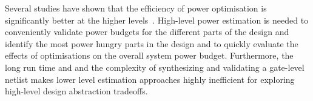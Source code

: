 %


Several studies have shown that the efficiency of power optimisation is significantly better at the higher levels~\cite{Landman1996,Gupta2000,Raghunathan2003,Reimer2006}.
High-level power estimation is needed to conveniently validate power budgets for the different parts of the design and identify the most power hungry parts in the design and to quickly evaluate the effects of optimisations on the overall system power budget.
Furthermore, the long run time and and the complexity of synthesizing and validating a gate-level netlist makes lower level estimation approaches highly inefficient for exploring high-level design abstraction tradeoffs.


